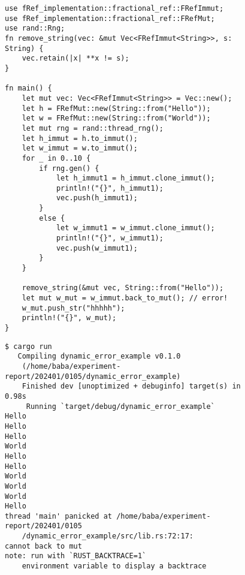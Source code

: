 \documentclass{sumiilab-paper}
\theoremstyle{mystyle}
\numberwithin{definition}{chapter} %
\begin{document}
\begin{figure}[p]
\begin{lstlisting}[caption=Mutableな参照へ戻せないことを検出する例, 
  label=error_example2, captionpos=b]
use fRef_implementation::fractional_ref::FRefImmut;
use fRef_implementation::fractional_ref::FRefMut;
use rand::Rng;
fn remove_string(vec: &mut Vec<FRefImmut<String>>, s: String) {
    vec.retain(|x| **x != s);
}

fn main() {
    let mut vec: Vec<FRefImmut<String>> = Vec::new();
    let h = FRefMut::new(String::from("Hello"));
    let w = FRefMut::new(String::from("World"));
    let mut rng = rand::thread_rng();
    let h_immut = h.to_immut();
    let w_immut = w.to_immut();
    for _ in 0..10 {
        if rng.gen() {
            let h_immut1 = h_immut.clone_immut();
            println!("{}", h_immut1);
            vec.push(h_immut1);
        }
        else {
            let w_immut1 = w_immut.clone_immut();
            println!("{}", w_immut1);
            vec.push(w_immut1);
        }
    }

    remove_string(&mut vec, String::from("Hello"));
    let mut w_mut = w_immut.back_to_mut(); // error!
    w_mut.push_str("hhhhh");
    println!("{}", w_mut);
}
\end{lstlisting}
\end{figure}
\begin{figure}[p]
\begin{lstlisting}[caption=FRefMutに戻し忘れた際のエラー, 
  label=error_result2, captionpos=b]
$ cargo run
   Compiling dynamic_error_example v0.1.0
    (/home/baba/experiment-report/202401/0105/dynamic_error_example)
    Finished dev [unoptimized + debuginfo] target(s) in 0.98s
     Running `target/debug/dynamic_error_example`
Hello
Hello
Hello
World
Hello
Hello
World
World
World
Hello
thread 'main' panicked at /home/baba/experiment-report/202401/0105
    /dynamic_error_example/src/lib.rs:72:17:
cannot back to mut
note: run with `RUST_BACKTRACE=1` 
    environment variable to display a backtrace
\end{lstlisting}
\end{figure}
\end{document}
